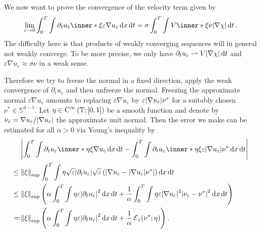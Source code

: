 We now want to prove the convergence of the velocity term given by
\begin{equation}
	\label{desired_convergence_velocity_term_twophase}
	\lim_{ \varepsilon \to 0 }
	\int_{ 0 }^{ T }
	\int
	\partial_{ t } u_{ \varepsilon }
	\inner*{ \xi }{ \varepsilon \nabla u_{ \varepsilon } }
	\dd{ x }
	\dd{ t }
	=
	\sigma
	\int_{ 0 }^{ T }
	\int
	V \inner*{ \xi }{ \nu }
	\abs{ \nabla \chi }
	\dd{ t }.
\end{equation}
The difficulty here is that products of weakly converging sequences will in 
general not weakly converge. To be more precise, we only have $ \partial_{ t } 
u_{ \varepsilon } \rightharpoonup V \abs{ \nabla \chi } \dd{ t } $ and 
$ \varepsilon \nabla u_{ \varepsilon } \approx \sigma \nu $ in a 
weak sense. 

Therefore we try to freeze the normal in a fixed direction, apply the weak 
convergence of $ \partial_{ t } u_{ \varepsilon } $ and then unfreeze the 
normal. Freezing the approximate normal $ \varepsilon \nabla u_{ \varepsilon } 
$ amounts to replacing $ \varepsilon \nabla u_{ 
\varepsilon } $ by $ 
\varepsilon \abs{ \nabla u_{ \varepsilon } } \nu^{ \ast } $ for a suitably 
chosen $ \nu^{ \ast } \in \mathbb{ S }^{ d-1 } $. Let $ \eta \in \operatorname{C}^{ \infty 
} \left( \operatorname{\mathbb{T}} ; [ 0 , 1 ] \right)$ be a smooth function and denote by $ 
\nu_{ \varepsilon } = \nabla u_{ 
\varepsilon } / \abs{ \nabla u_{ \varepsilon } } $ the approximate unit normal. 
Then the error we make can be estimated for all $ 
\alpha > 0 $ via Young's inequality by
\begin{align}
	\notag
	&\abs{
		\int_{ 0 }^{ T }
		\int
		\partial_{ t } u_{ \varepsilon }
		\inner*{ \eta \xi }{ \nabla u_{ \varepsilon } }
		\dd{ x }
		\dd{ t }
		-
		\int_{ 0 }^{ T }
		\int
		\partial_{ t } u_{ \varepsilon }
		\inner*{ \eta \xi }{ \varepsilon \abs{ \nabla u_{ \varepsilon } } \nu^{ 
		\ast 
		} }
		\dd{ x }
		\dd{ t }
	}
	\\
	\notag
	\leq {} &
	\norm{ \xi }_{ \mathrm{sup} }
	\int_{ 0 }^{ T }
	\int
	\eta
	\sqrt{ \varepsilon }
	\abs{ \partial_{  t } u_{ \varepsilon } }
	\sqrt{  \varepsilon } 
	\left(
	\abs{
		\nabla u_{ \varepsilon }
		-
		\abs{ \nabla u_{ \varepsilon } }
		\nu^{ \ast }
	}
	\right)
	\dd{ x } 
	\dd{ t }
	\\
	\notag
	\leq {} &
	\norm{ \xi }_{ \mathrm{sup} }
	\left(
	\alpha 
	\int_{ 0 }^{ T }
	\int
	\eta
	\varepsilon \abs{ \partial_{ t } u_{ \varepsilon } }^{ 2 }
	\dd{ x }
	\dd{ t }
	+
	\frac{ 1 }{ \alpha }
	\int_{ 0 }^{ T }
	\int
	\eta
	\varepsilon
	\abs{ \nabla u_{ \varepsilon } }^{ 2 }
	\abs{
		\nu_{ \varepsilon } - \nu^{ \ast } 
	}^{ 2 } 
	\dd{ x }
	\dd{ t }
	\right)
	\\
	\label{acceptable_error_term_velocity_twophase}
	\eqqcolon
	&
	\norm{ \xi }_{ \mathrm{sup} }
	\left( 
	\alpha 	
	\int_{ 0 }^{ T }
	\int
	\eta
	\varepsilon \abs{ \partial_{ t } u_{ \varepsilon } }^{ 2 }
	\dd{ x }
	\dd{ t }
	+ 
	\frac{ 1 }{ \alpha }
	\tilt_excess_{ \varepsilon } ( \nu^{ \ast } ; \eta ) 
	\right).
\end{align}
